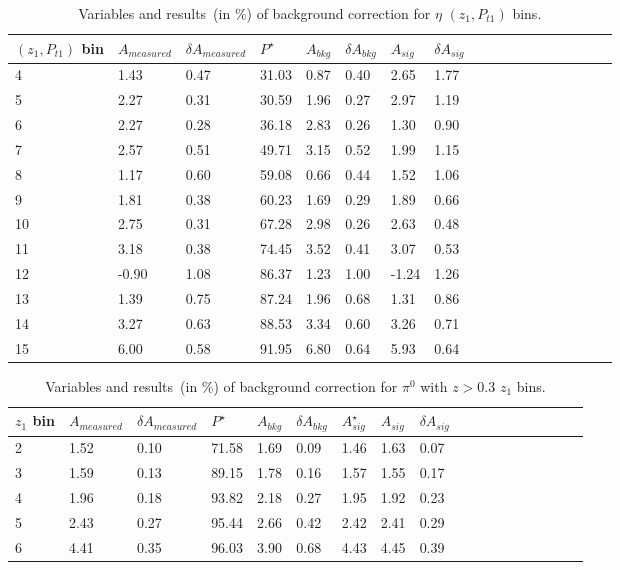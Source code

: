 \begin{table}[H]\footnotesize
\centering
\begin{tabular}{|l|l|l|l|l|l|l|l|l|l|l|l|l|l|l|l|l|l|}
\\ \hline
$(z_{1},P_{t1})$ bin & $A_{measured}$ & $\delta A_{measured}$ & $P^{\star}$ & $A_{bkg}$ & $\delta A_{bkg}$ &  $ A_{sig}$  & $\delta A_{sig}$ \\ \hline
4 & 1.43 & 0.47 & 31.03 & 0.87 & 0.40 & 2.65  & 1.77 \\ \hline 
5 & 2.27 & 0.31 & 30.59 & 1.96 & 0.27 & 2.97  & 1.19 \\ \hline 
6 & 2.27 & 0.28 & 36.18 & 2.83 & 0.26 & 1.30  & 0.90 \\ \hline 
7 & 2.57 & 0.51 & 49.71 & 3.15 & 0.52 & 1.99  & 1.15 \\ \hline 
8 & 1.17 & 0.60 & 59.08 & 0.66 & 0.44 & 1.52 & 1.06 \\ \hline 
9 & 1.81 & 0.38 & 60.23 & 1.69 & 0.29 & 1.89  & 0.66 \\ \hline 
10 & 2.75 & 0.31 & 67.28 & 2.98 & 0.26 & 2.63  & 0.48 \\ \hline 
11 & 3.18 & 0.38 & 74.45 & 3.52 & 0.41 & 3.07 & 0.53 \\ \hline 
12 & -0.90 & 1.08 & 86.37 & 1.23 & 1.00 & -1.24  & 1.26 \\ \hline 
13 & 1.39 & 0.75 & 87.24 & 1.96 & 0.68 & 1.31  & 0.86 \\ \hline 
14 & 3.27 & 0.63 & 88.53 & 3.34 & 0.60 & 3.26  & 0.71 \\ \hline 
15 & 6.00 & 0.58 & 91.95 & 6.80 & 0.64 & 5.93  & 0.64 \\ \hline 
\end{tabular}
\caption{Variables and results~(in $\%$) of background correction for $\eta$ $(z_1,P_{t1})$ bins.}
\label{tab:etazptbkgcor}
\end{table} 

\begin{table}[H]\footnotesize
\centering
\begin{tabular}{|l|l|l|l|l|l|l|l|l|l|l|l|l|l|l|l|l|l|}
\\ \hline
$z_1$ bin & $A_{measured}$ & $\delta A_{measured}$ & $P^{\star}$  & $A_{bkg}$ & $\delta A_{bkg}$ & $A_{sig}^{\star}$ & $ A_{sig}$  & $\delta A_{sig}$ \\ \hline
2 & 1.52 & 0.10 & 71.58 & 1.69 & 0.09 & 1.46 & 1.63 & 0.07 \\ \hline 
3 & 1.59 & 0.13 & 89.15 & 1.78 & 0.16 & 1.57 & 1.55 & 0.17 \\ \hline 
4 & 1.96 & 0.18 & 93.82 & 2.18 & 0.27 & 1.95 & 1.92 & 0.23 \\ \hline 
5 & 2.43 & 0.27 & 95.44 & 2.66 & 0.42 & 2.42 & 2.41 & 0.29 \\ \hline 
6 & 4.41 & 0.35 & 96.03 & 3.90 & 0.68 & 4.43 & 4.45 & 0.39 \\ \hline 
 \end{tabular}
\caption{Variables and results~(in $\%$) of background correction for $\pi^0$ with $z>0.3$ $z_1$ bins. }
\label{tab:pi0sinzbkgcor}
\end{table}

